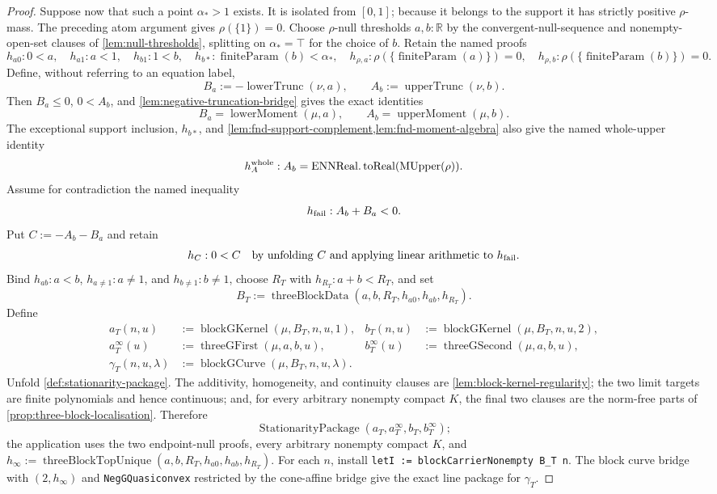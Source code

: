 \documentclass[9pt]{extarticle}
\theoremstyle{definition}
\theoremstyle{remark}
\newcommand{\R}{\mathbb R}
\begin{document}
\begin{proof}
Suppose now that such a point $\alpha_*>1$ exists.  It is isolated from
$[0,1]$; because it belongs to the support it has strictly positive
$\rho$-mass.  The preceding atom argument gives $\rho(\{1\})=0$.
Choose $\rho$-null thresholds $a,b:\R$ by the convergent-null-sequence and
nonempty-open-set clauses of \cref{lem:null-thresholds}, splitting on
$\alpha_*=\top$ for the choice of $b$.  Retain the named proofs
\[
 h_{a0}:0<a,\quad h_{a1}:a<1,\quad h_{b1}:1<b,\quad
 h_{b*}:\operatorname{finiteParam}(b)<\alpha_*,\quad
 h_{\rho,a}:\rho(\{\operatorname{finiteParam}(a)\})=0,\quad
 h_{\rho,b}:\rho(\{\operatorname{finiteParam}(b)\})=0.
\]
Define, without referring to an equation label,
\[
 B_a:=-\operatorname{lowerTrunc}(\nu,a),\qquad
 A_b:=\operatorname{upperTrunc}(\nu,b).
\]
Then $B_a\leq0$, $0<A_b$, and
\cref{lem:negative-truncation-bridge} gives the exact identities
\[
 B_a=\operatorname{lowerMoment}(\mu,a),\qquad
 A_b=\operatorname{upperMoment}(\mu,b).
\]
The exceptional support inclusion, $h_{b*}$, and
\cref{lem:fnd-support-complement,lem:fnd-moment-algebra} also give the named
whole-upper identity
\[
 h_A^{\rm whole}:A_b=
  \operatorname{ENNReal.toReal}(\operatorname{MUpper}(\rho)).
\]
Assume for contradiction the named inequality
\[
 h_{\rm fail}:A_b+B_a<0.
\]
Put $C:=-A_b-B_a$ and retain
\[
 h_C:0<C
 \quad\text{by unfolding \(C\) and applying linear arithmetic to
 \(h_{\rm fail}\)}.
\]
Bind $h_{ab}:a<b$, $h_{a\ne1}:a\neq1$, and $h_{b\ne1}:b\neq1$, choose
$R_T$ with $h_{R_T}:a+b<R_T$, and set
\[
 B_T:=\operatorname{threeBlockData}
  (a,b,R_T,h_{a0},h_{ab},h_{R_T}).
\]
Define
\begin{align*}
 a_T(n,u)&:=\operatorname{blockGKernel}(\mu,B_T,n,u,1),&
 b_T(n,u)&:=\operatorname{blockGKernel}(\mu,B_T,n,u,2),\\
 a_T^\infty(u)&:=\operatorname{threeGFirst}(\mu,a,b,u),&
 b_T^\infty(u)&:=\operatorname{threeGSecond}(\mu,a,b,u),\\
 \gamma_T(n,u,\lambda)&:=
  \operatorname{blockGCurve}(\mu,B_T,n,u,\lambda).
\end{align*}
Unfold \cref{def:stationarity-package}.  The additivity, homogeneity, and
continuity clauses are \cref{lem:block-kernel-regularity}; the two limit
targets are finite polynomials and hence continuous; and, for every
arbitrary nonempty compact $K$, the final two clauses are the norm-free
parts of \cref{prop:three-block-localisation}.  Therefore
\[
 \operatorname{StationarityPackage}
  (a_T,a_T^\infty,b_T,b_T^\infty);
\]
the application uses the two endpoint-null proofs, every arbitrary nonempty
compact $K$, and
$h_\infty:=\operatorname{threeBlockTopUnique}
 (a,b,R_T,h_{a0},h_{ab},h_{R_T})$.
For each $n$, install
\texttt{letI := blockCarrierNonempty B\_T n}.  The block curve bridge with
$(2,h_\infty)$ and
\texttt{NegGQuasiconvex} restricted by the cone-affine bridge give the exact
line package for $\gamma_T$.


\end{proof}
\end{document}
